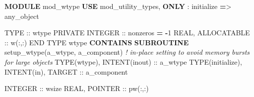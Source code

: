 \documentclass[
]{scrartcl}
\newenvironment{Shaded}{}{}
\newcommand{\CommentTok}[1]{\textcolor[rgb]{0.38,0.63,0.69}{\textit{#1}}}
\newcommand{\DataTypeTok}[1]{\textcolor[rgb]{0.56,0.13,0.00}{#1}}
\newcommand{\DecValTok}[1]{\textcolor[rgb]{0.25,0.63,0.44}{#1}}
\newcommand{\KeywordTok}[1]{\textcolor[rgb]{0.00,0.44,0.13}{\textbf{#1}}}
\newcommand{\NormalTok}[1]{#1}
\newcommand{\OperatorTok}[1]{\textcolor[rgb]{0.40,0.40,0.40}{#1}}
\begin{document}
\begin{Shaded}
\begin{Highlighting}[]
\KeywordTok{MODULE}\NormalTok{ mod\_wtype}
   \KeywordTok{USE}\NormalTok{ mod\_utility\_types, }\KeywordTok{ONLY}\NormalTok{ : initialize }\KeywordTok{=}\OperatorTok{\textgreater{}}\NormalTok{ any\_object}

   \DataTypeTok{TYPE} \DataTypeTok{::}\NormalTok{ wtype}
      \DataTypeTok{PRIVATE}
      \DataTypeTok{INTEGER} \DataTypeTok{::}\NormalTok{ nonzeros }\KeywordTok{=} \KeywordTok{{-}}\DecValTok{1}
      \DataTypeTok{REAL}\NormalTok{, }\DataTypeTok{ALLOCATABLE} \DataTypeTok{::}\NormalTok{ w(:,:)}
   \DataTypeTok{END TYPE}\NormalTok{ wtype}
\KeywordTok{CONTAINS}
   \KeywordTok{SUBROUTINE}\NormalTok{ setup\_wtype(a\_wtype, a\_component)}
      \CommentTok{! in{-}place setting to avoid memory bursts for large objects}
      \DataTypeTok{TYPE(wtype)}\NormalTok{, }\DataTypeTok{INTENT(inout)} \DataTypeTok{::}\NormalTok{ a\_wtype}
      \DataTypeTok{TYPE(initialize)}\NormalTok{, }\DataTypeTok{INTENT(in)}\NormalTok{, }\DataTypeTok{TARGET} \DataTypeTok{::}\NormalTok{ a\_component}

      \DataTypeTok{INTEGER} \DataTypeTok{::}\NormalTok{ wsize}
      \DataTypeTok{REAL}\NormalTok{, }\DataTypeTok{POINTER} \DataTypeTok{::}\NormalTok{ pw(:,:)}


\end{Highlighting}
\end{Shaded}
\end{document}
